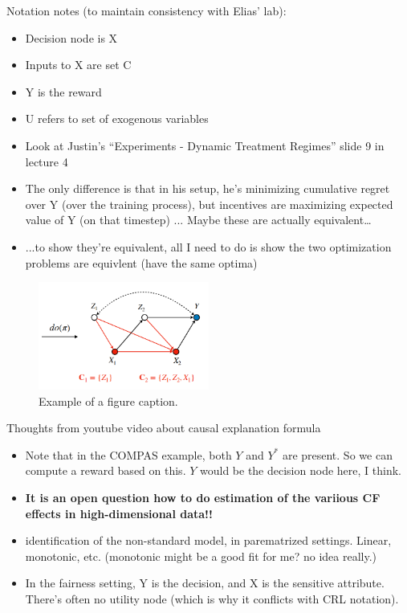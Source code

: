 \documentclass[letterpaper,10pt]{article}
\begin{document}
Notation notes (to maintain consistency with Elias’ lab):
\begin{itemize}
\item Decision node is X
\item Inputs to X are set C
\item Y is the reward
\item U refers to set of exogenous variables
\item Look at Justin’s “Experiments - Dynamic Treatment Regimes” slide 9 in lecture 4
\item The only difference is that in his setup, he’s minimizing cumulative regret over Y (over the training process), but incentives are maximizing expected value of Y (on that timestep) ... Maybe these are actually equivalent…
\item ...to show they're equivalent, all I need to do is show the two optimization problems are equivlent (have the same optima)
\end{itemize}

\begin{figure}[htbp]
\centerline{\includegraphics[width=0.5\textwidth]{pics/incentives_example_lecture_4.png}}
\caption{Example of a figure caption.}
\label{fig}
\end{figure}

Thoughts from youtube video about causal explanation formula
\begin{itemize}
  \item Note that in the COMPAS example, both $Y$ and $Y^*$ are present. So we can compute a reward based on this. $Y$ would be the decision node here, I think.
  \item \textbf{It is an open question how to do estimation of the variious CF effects in high-dimensional data!!}
  \item identification of the non-standard model, in parematrized settings. Linear, monotonic, etc. (monotonic might be a good fit for me? no idea really.)
  \item In the fairness setting, Y is the decision, and X is the sensitive attribute. There's often no utility node (which is why it conflicts with CRL notation).
\end{itemize}
\end{document}
